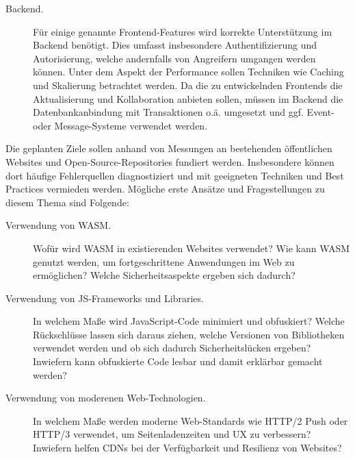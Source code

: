 \begin{description}
    \item[Backend.] Für einige genannte Frontend-Features wird korrekte Unterstützung im Backend benötigt.
    Dies umfasst insbesondere Authentifizierung und Autorisierung, welche andernfalls von Angreifern umgangen werden können.
    Unter dem Aspekt der Performance sollen Techniken wie Caching und Skalierung betrachtet werden.
    Da die zu entwickelnden Frontends die Aktualisierung und Kollaboration anbieten sollen, müssen im Backend die Datenbankanbindung mit Transaktionen o.ä. umgesetzt und ggf. Event- oder Message-Systeme verwendet werden.
\end{description}

Die geplanten Ziele sollen anhand von Messungen an bestehenden öffentlichen Websites und Open-Source-Repositories fundiert werden.
Insbesondere können dort häufige Fehlerquellen diagnostiziert und mit geeigneten Techniken und Best Practices vermieden werden.
Mögliche erste Ansätze und Fragestellungen zu diesem Thema sind Folgende:

\begin{description}
    \item[Verwendung von WASM.]
    Wofür wird WASM in existierenden Websites verwendet?
    Wie kann WASM genutzt werden, um fortgeschrittene Anwendungen im Web zu ermöglichen?
    Welche Sicherheitsaspekte ergeben sich dadurch?
    \item[Verwendung von JS-Frameworks und Libraries.]
    In welchem Maße wird JavaScript-Code minimiert und obfuskiert?
    Welche Rückschlüsse lassen sich daraus ziehen, welche Versionen von Bibliotheken verwendet werden und ob sich dadurch Sicherheitslücken ergeben?
    Inwiefern kann obfuskierte Code lesbar und damit erklärbar gemacht werden?
    \item[Verwendung von moderenen Web-Technologien.]
    In welchem Maße werden moderne Web-Standards wie HTTP/2 Push oder HTTP/3 verwendet, um Seitenladenzeiten und UX zu verbessern?
    Inwiefern helfen CDNs bei der Verfügbarkeit und Resilienz von Websites?
\end{description}

